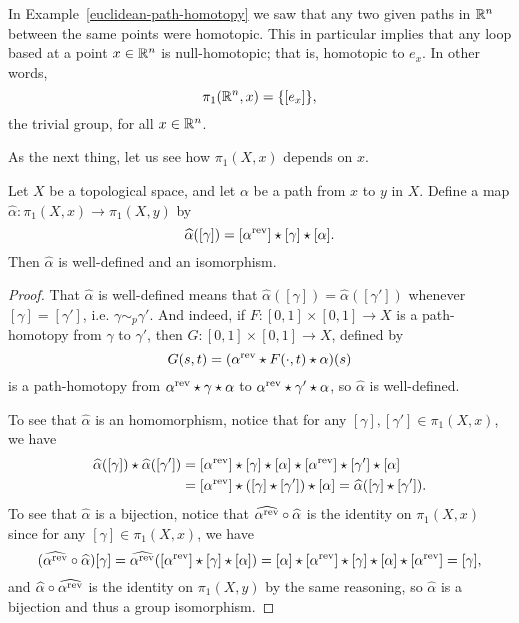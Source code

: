 \begin{example}
  \label{fundemental-group-euclidean}
  In Example~\ref{euclidean-path-homotopy} we saw that any two given paths in $\mathbb{R}^n$ between the same points were homotopic. This in particular implies that any loop based at a point $x \in \mathbb{R}^n$ is null-homotopic; that is, homotopic to $e_x$. In other words,
  \[
    \pi_1(\mathbb{R}^n, x) = \{[e_x]\},
  \]
  the trivial group, for all $x \in \mathbb{R}^n$.
\end{example}
As the next thing, let us see how $\pi_1(X,x)$ depends on $x$.
\begin{thm}
  \label{fundamental-group-independent-of-basepoint}
  Let $X$ be a topological space, and let $\alpha$ be a path from $x$ to $y$ in $X$. Define a map $\hat{\alpha} : \pi_1(X,x) \to \pi_1(X,y)$ by
  \[
    \widehat{\alpha}([\gamma]) = [\alpha^{\mathrm{rev}}] \star [\gamma] \star [\alpha].
  \]
  Then $\hat{\alpha}$ is well-defined and an isomorphism.
\end{thm}
\begin{proof}
  That $\hat{\alpha}$ is well-defined means that $\hat{\alpha}([\gamma]) = \hat{\alpha}([\gamma'])$ whenever $[\gamma] = [\gamma']$, i.e. $\gamma \sim_p \gamma'$. And indeed, if $F: [0,1] \times [0,1] \to X$ is a path-homotopy from $\gamma$ to $\gamma'$, then $G : [0,1] \times [0,1] \to X$, defined by
  \[
    G(s,t) = (\alpha^{\mathrm{rev}} \star F(\cdot,t) \star \alpha)(s)
  \]
  is a path-homotopy from $\alpha^{\mathrm{rev}} \star \gamma \star \alpha$ to $\alpha^{\mathrm{rev}} \star \gamma' \star \alpha$, so $\hat{\alpha}$ is well-defined.

  To see that $\hat{\alpha}$ is an homomorphism, notice that for any $[\gamma], [\gamma'] \in \pi_1(X,x)$, we have
  \begin{align*}
    \widehat{\alpha}([\gamma]) \star \widehat{\alpha}([\gamma']) &= [\alpha^{\mathrm{rev}}] \star [\gamma] \star [\alpha] \star [\alpha^{\mathrm{rev}}] \star [\gamma'] \star [\alpha] \\
      &= [\alpha^{\mathrm{rev}}] \star ([\gamma] \star [\gamma']) \star [\alpha] = \widehat{\alpha}([\gamma] \star [\gamma']).
  \end{align*}
  To see that $\hat{\alpha}$ is a bijection, notice that $\widehat{\alpha^{\mathrm{rev}}} \circ \widehat{\alpha}$ is the identity on $\pi_1(X,x)$ since for any $[\gamma] \in \pi_1(X,x)$, we have
  \[
    (\widehat{\alpha^{\mathrm{rev}}} \circ \widehat{\alpha})[\gamma] = \widehat{\alpha^{\mathrm{rev}}}([\alpha^{\mathrm{rev}}] \star [\gamma] \star [\alpha]) = [\alpha] \star [\alpha^{\mathrm{rev}}] \star [\gamma] \star [\alpha] \star [\alpha^{\mathrm{rev}}] = [\gamma],
  \]
  and $\widehat{\alpha} \circ \widehat{\alpha^{\mathrm{rev}}}$ is the identity on $\pi_1(X,y)$ by the same reasoning, so $\hat{\alpha}$ is a bijection and thus a group isomorphism.
\end{proof}
